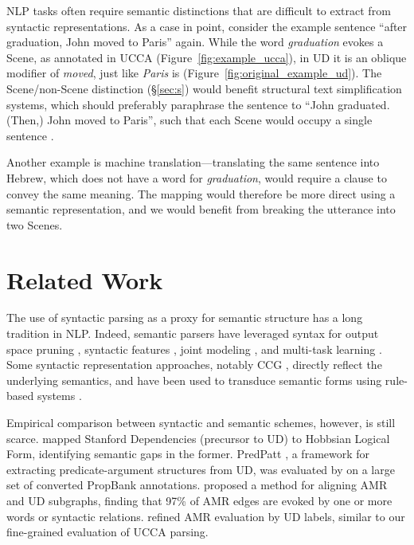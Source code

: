\documentclass[11pt,a4paper,table]{article}
\begin{document}
NLP tasks
often require semantic distinctions that are difficult to extract from syntactic representations.
As a case in point, consider the example sentence
``after graduation, John moved to Paris'' again.
While the word \textit{graduation} evokes a Scene, as annotated in UCCA
(Figure~\ref{fig:example_ucca}), in UD it is an oblique modifier of \textit{moved},
just like \textit{Paris} is (Figure~\ref{fig:original_example_ud}).
The Scene/non-Scene distinction (\S\ref{sec:s})
would benefit structural text simplification systems,
which should preferably paraphrase the sentence to
``John graduated. (Then,) John moved to Paris'',
such that each Scene would occupy a single sentence \cite{sulem2018samsa}.

Another example is machine translation---translating the same sentence into Hebrew,
which does not have a word for \textit{graduation},
would require a clause to convey the same meaning.
The mapping would therefore be more direct using a semantic representation,
and we would benefit from breaking the utterance into two Scenes.


\section{Related Work}\label{sec:related_work}

The use of syntactic parsing as a proxy for semantic structure has a long tradition in NLP.
Indeed, semantic parsers have leveraged syntax
for output space pruning \cite{xue2004calibrating}, 
syntactic features \cite{gildea2002automatic,hershcovich2017a}, 
joint modeling \cite{surdeanu2008conll,hajivc2009conll}, and
multi-task learning \cite{swayamdipta2016greedy,swayamdipta2018syntactic,hershcovich2018multitask}.
Some syntactic representation approaches, notably CCG \cite{Steedman:00},
directly reflect the underlying semantics, and have been used to
transduce semantic forms using rule-based systems \cite{Basile:12}.
  
Empirical comparison between syntactic and semantic schemes, however,
is still scarce.
 mapped Stanford Dependencies
(precursor to UD) to Hobbsian Logical Form, identifying semantic gaps in the former.
PredPatt \citep{white2016universal},
a framework for extracting predicate-argument structures from UD,
was evaluated by 
on a large set of converted PropBank annotations.
 proposed a method for aligning AMR and UD subgraphs,
finding that 97\% of AMR edges are evoked by one or more
words or syntactic relations.
 refined AMR evaluation by UD labels,
similar to our fine-grained evaluation of UCCA parsing.
\end{document}
